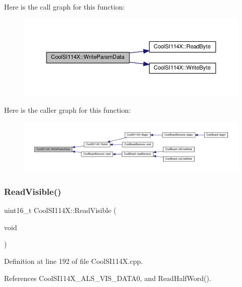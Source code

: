 Here is the call graph for this function\+:\nopagebreak
\begin{figure}[H]
\begin{center}
\leavevmode
\includegraphics[width=350pt]{dd/d67/class_cool_s_i114_x_abf45eb10a6de1be16e68a51624fa2608_cgraph}
\end{center}
\end{figure}
Here is the caller graph for this function\+:
\nopagebreak
\begin{figure}[H]
\begin{center}
\leavevmode
\includegraphics[width=350pt]{dd/d67/class_cool_s_i114_x_abf45eb10a6de1be16e68a51624fa2608_icgraph}
\end{center}
\end{figure}
\mbox{\label{class_cool_s_i114_x_a42e0e574256341443c647a4c0eda87d5}} 
\subsubsection{\texorpdfstring{Read\+Visible()}{ReadVisible()}}
{\footnotesize\ttfamily uint16\+\_\+t Cool\+S\+I114\+X\+::\+Read\+Visible (\begin{DoxyParamCaption}\item[{void}]{ }\end{DoxyParamCaption})}



Definition at line 192 of file Cool\+S\+I114\+X.\+cpp.



References Cool\+S\+I114\+X\+\_\+\+A\+L\+S\+\_\+\+V\+I\+S\+\_\+\+D\+A\+T\+A0, and Read\+Half\+Word().



